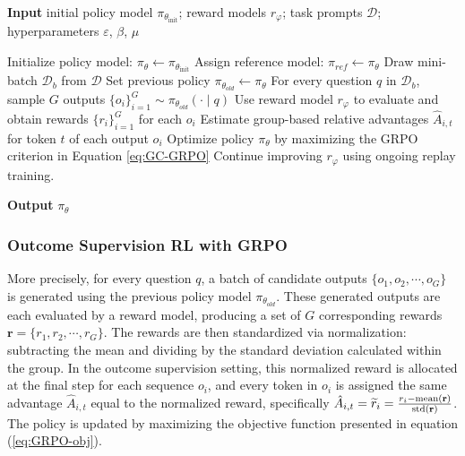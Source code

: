 \begin{itemize}[topsep=0pt]
\begin{algorithm}[t]
  \small
  \caption{Iterative Group Relative Policy Optimization}
  \textbf{Input} initial policy model $\pi_{\theta_{\text{init}}}$; reward models $r_\varphi$; task prompts $\mathcal{D}$; 
  hyperparameters $\varepsilon$, $\beta$, $\mu$
  \begin{algorithmic}[1]
    \State Initialize policy model: $\pi_\theta \gets \pi_{\theta_{\text{init}}}$
        \State Assign reference model: $\pi_{ref} \gets \pi_{\theta}$
            \State Draw mini-batch $\mathcal{D}_b$ from $\mathcal{D}$
            \State Set previous policy $\pi_{\theta_{old}} \gets \pi_{\theta}$
            \State For every question $q$ in $\mathcal{D}_b$, sample $G$ outputs $\{o_i\}_{i=1}^G \sim \pi_{\theta_{old}} (\cdot \mid q) $
            \State Use reward model $r_{\varphi}$ to evaluate and obtain rewards $\{r_i\}_{i=1}^{G}$ for each $o_i$
            \State Estimate group-based relative advantages $\hat{A}_{i,t}$ for token $t$ of each output $o_i$
                \State Optimize policy $\pi_{\theta}$ by maximizing the GRPO criterion in Equation \ref{eq:GC-GRPO}
            \EndFor
        \EndFor
        \State Continue improving $r_\varphi$ using ongoing replay training. 
    \EndFor 
  \end{algorithmic}
  \textbf{Output} $\pi_\theta$
  \label{alg:iter-grpo}
\end{algorithm}

\subsubsection{Outcome Supervision RL with GRPO} More precisely, for every question $q$, a batch of candidate outputs $\{o_1, o_2, \cdots, o_G\}$ is generated using the previous policy model $\pi_{\theta_{old}}$. These generated outputs are each evaluated by a reward model, producing a set of $G$ corresponding rewards $\mathbf{r}=\{r_1, r_2, \cdots, r_G\}$. The rewards are then standardized via normalization: subtracting the mean and dividing by the standard deviation calculated within the group. In the outcome supervision setting, this normalized reward is allocated at the final step for each sequence $o_i$, and every token in $o_i$ is assigned the same advantage $\hat{A}_{i, t}$ equal to the normalized reward, specifically $\hat{A}_{i, t} = \widetilde{r}_i = \frac{r_i- {\rm mean}(\mathbf{r})}{{\rm std}(\mathbf{r})}$. The policy is updated by maximizing the objective function presented in equation (\ref{eq:GRPO-obj}).


\end{itemize}
